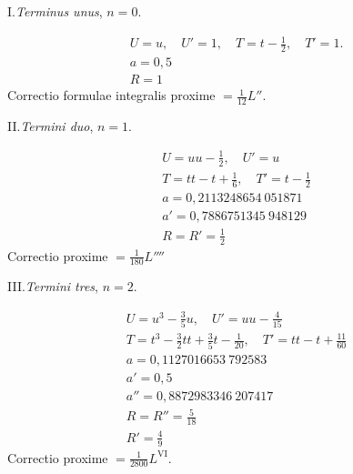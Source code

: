 \begingroup\renewcommand{\arraystretch}{1.6}
\par{}\begin{center}I.\quad\textit{Terminus unus}, \(n=0\).\end{center}
\[
\begin{array}{l}
U=u,\quad U'=1,\quad T=t-\frac{1}{2},\quad T'=1.\\
a=0{,}5\\
R=1
\end{array}
\]
\noindent Correctio formulae integralis proxime \(=\frac{1}{12}L''\).

\par{}\begin{center}II.\quad\textit{Termini duo}, \(n=1\).\end{center}
\[
\begin{array}{l}
U=uu-\frac{1}{2},\quad U'=u\\
T=tt-t+\frac{1}{6},\quad T'=t-\frac{1}{2}\\
a=0{,}2113248654\ 051871\\
a'=0{,}7886751345\ 948129\\
R=R'=\frac{1}{2}
\end{array}
\]
\noindent Correctio proxime \(=\frac{1}{180}L''''\)

\par{}\begin{center}III.\quad\textit{Termini tres}, \(n=2\).\end{center}
\[
\begin{array}{l}
U=u^3-\frac{3}{5}u,\quad U'=uu-\frac{4}{15}\\
T=t^3-\frac{3}{2}tt+\frac{3}{5}t-\frac{1}{20},\quad T'=tt-t+\frac{11}{60}\\
a=0{,}1127016653\ 792583\\
a'=0{,}5\\
a''=0{,}8872983346\ 207417\\
R=R''=\frac{5}{18}\\
R'=\frac{4}{9}
\end{array}
\]
\noindent Correctio proxime \(=\frac{1}{2800}L^{\mathrm{VI}}\).

